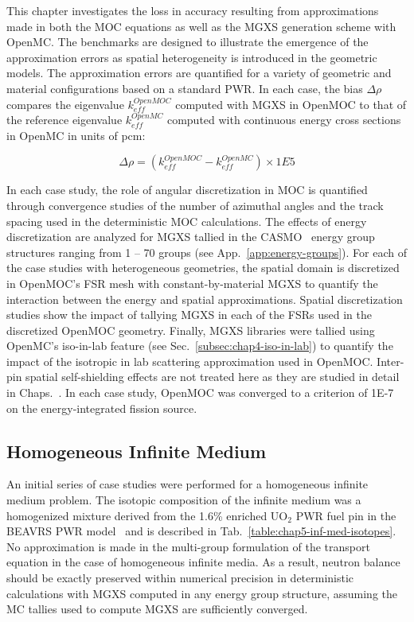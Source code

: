 This chapter investigates the loss in accuracy resulting from approximations made in both the \ac{MOC} equations as well as the \ac{MGXS} generation scheme with OpenMC. The benchmarks are designed to illustrate the emergence of the approximation errors as spatial heterogeneity is introduced in the geometric models. The approximation errors are quantified for a variety of geometric and material configurations based on a standard \ac{PWR}. In each case, the bias $\Delta\rho$ compares the eigenvalue $k_{eff}^{OpenMOC}$ computed with \ac{MGXS} in OpenMOC to that of the reference eigenvalue $k_{eff}^{OpenMC}$ computed with continuous energy cross sections in OpenMC in units of \ac{pcm}:

\begin{equation}
\label{eqn:chap5-delta-rho}
\Delta\rho = \left(k_{eff}^{OpenMOC} - k_{eff}^{OpenMC}\right) \times 1E5
\end{equation}

In each case study, the role of angular discretization in \ac{MOC} is quantified through convergence studies of the number of azimuthal angles and the track spacing used in the deterministic \ac{MOC} calculations. The effects of energy discretization are analyzed for \ac{MGXS} tallied in the CASMO~\cite{rhodes2006casmo} energy group structures ranging from 1 -- 70 groups (see App.~\ref{app:energy-groups}). For each of the case studies with heterogeneous geometries, the spatial domain is discretized in OpenMOC's \ac{FSR} mesh with constant-by-material \ac{MGXS} to quantify the interaction between the energy and spatial approximations. Spatial discretization studies show the impact of tallying \ac{MGXS} in each of the \ac{FSR}s used in the discretized OpenMOC geometry. Finally, \ac{MGXS} libraries were tallied using OpenMC's iso-in-lab feature (see Sec.~\ref{subsec:chap4-iso-in-lab}) to quantify the impact of the isotropic in lab scattering approximation used in OpenMOC. Inter-pin spatial self-shielding effects are not treated here as they are studied in detail in Chaps.~. In each case study, OpenMOC was converged to a criterion of 1E-7 on the energy-integrated fission source.

\subsection{Homogeneous Infinite Medium}
\label{subsec:chap5-inf-medium}

An initial series of case studies were performed for a homogeneous infinite medium problem. The isotopic composition of the infinite medium was a homogenized mixture derived from the 1.6\% enriched UO$_2$ \ac{PWR} fuel pin in the \ac{BEAVRS} \ac{PWR} model~\cite{horelik2013beavrs} and is described in Tab.~\ref{table:chap5-inf-med-isotopes}. No approximation is made in the multi-group formulation of the transport equation in the case of homogeneous infinite media. As a result, neutron balance should be exactly preserved within numerical precision in deterministic calculations with \ac{MGXS} computed in any energy group structure, assuming the \ac{MC} tallies used to compute \ac{MGXS} are sufficiently converged.


